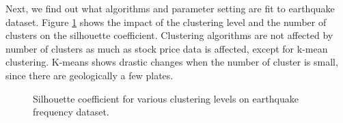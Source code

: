 \documentclass{article}
\begin{document}
Next, we find out what algorithms and parameter setting are fit to earthquake dataset. Figure \ref{silhouette_levels_eq} shows the impact of the clustering level and the number of clusters on the silhouette coefficient. Clustering algorithms are not affected by number of clusters as much as stock price data is affected, except for k-mean clustering. K-means shows drastic changes when the number of cluster is small, since there are geologically a few plates.

\begin{figure}[H]
\centering
{}
\caption{Silhouette coefficient for various clustering levels on earthquake frequency dataset.} \label{silhouette_levels_eq}
\end{figure}
\end{document}
